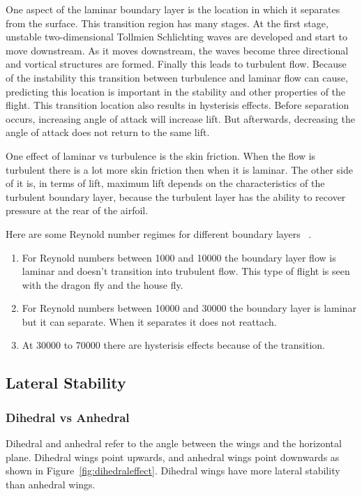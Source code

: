 One aspect of the laminar boundary layer is the location in which it separates from the surface.
This transition region has many stages. At the first stage, unstable two-dimensional Tollmien Schlichting
waves are developed and start to move downstream. As it moves downstream, the waves become three directional
and vortical structures are formed. Finally this leads to turbulent flow.
Because of the instability this transition between turbulence and laminar flow 
can cause, predicting this location is important in the stability and other properties of the flight. 
This transition location also results in hysterisis effects. Before separation
occurs, increasing angle of attack will increase lift. But afterwards,
decreasing the angle of attack does not return to the same lift. 

One effect of laminar vs turbulence is the skin friction. When the flow is turbulent there
is a lot more skin friction then when it is laminar. The other side of it is, 
in terms of lift, maximum
lift depends on the characteristics of the turbulent boundary layer, because the
turbulent layer has the ability to recover pressure at the
rear of the airfoil.

Here are some Reynold number regimes for different boundary layers ~\cite{mueller}.

\begin{enumerate}
\item For Reynold numbers between 1000 and 10000 the boundary layer flow is laminar
and doesn't transition into trubulent flow. This type of flight is seen with
the dragon fly and the house fly. 
\item  For Reynold numbers between 10000 and 30000 the boundary layer is laminar but
it can separate. When it separates it does not reattach.
\item At 30000 to 70000 there are hysterisis effects because of the transition. 

\end{enumerate}

\subsection{Lateral Stability}

\subsubsection{Dihedral vs Anhedral}
\label{sec:dihedral}

Dihedral and anhedral refer to the angle between the wings and the horizontal plane.
Dihedral wings point upwards, and anhedral wings point
downwards as shown in Figure~\ref{fig:dihedraleffect}. Dihedral wings have more lateral 
stability than anhedral wings.


